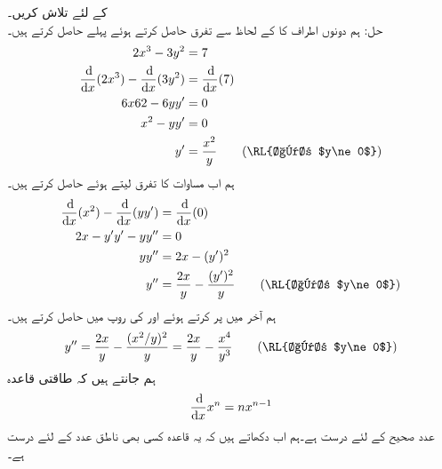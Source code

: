  کے لئے  تلاش کریں۔\\
حل:\quad
ہم دونوں اطراف کا  کے لحاظ سے تفرق حاصل کرتے ہوئے پہلے  حاصل کرتے ہیں۔
\begin{align*}
2x^3-3y^2&=7\\
\frac{\dif}{\dif x}(2x^3)-\frac{\dif}{\dif x}(3y^2)&=\frac{\dif}{\dif x}(7)\\
6x62-6yy'&=0\\
x^2-yy'&=0\\
y'&=\frac{x^2}{y}\quad\quad \text{(\RL{اگر $y\ne 0$})}
\end{align*}
ہم اب مساوات  کا تفرق لیتے ہوئے  حاصل کرتے ہیں۔
\begin{align*}
\frac{\dif}{\dif x}(x^2)-\frac{\dif}{\dif x}(yy')&=\frac{\dif}{\dif x}(0)\\
2x-y'y'-yy''&=0\\
yy''&=2x-(y')^2\\
y''&=\frac{2x}{y}-\frac{(y')^2}{y}\quad\quad \text{(\RL{اگر $y\ne 0$})}
\end{align*}
ہم آخر میں  پر کرتے ہوئے  اور  کی روپ میں  حاصل کرتے ہیں۔
\begin{align*}
y''=\frac{2x}{y}-\frac{(x^2/y)^2}{y}=\frac{2x}{y}-\frac{x^4}{y^3}\quad\quad \text{(\RL{اگر $y\ne 0$})}
\end{align*}
ہم  جانتے ہیں کہ طاقتی قاعدہ
\begin{align*}
\frac{\dif}{\dif x}x^n=nx^{n-1}
\end{align*}
عدد صحیح  کے لئے درست ہے۔ہم اب دکھاتے ہیں کہ یہ قاعدہ کسی بھی ناطق عدد کے لئے درست ہے۔

